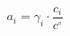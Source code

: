 \documentclass[preview]{standalone}
\begin{document}
\[a_i = \gamma_i \cdot \frac{c_i}{c^\circ} \tag{1.9}\]
\end{document}
